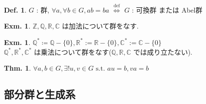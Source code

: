 \documentclass[uplatex,dvipdfmx,9pt]{beamer}
\newcommand{\defarrow}{\overset{\mathrm{def}}{\Leftrightarrow}}
\newcommand{\st}{\text{ s.t. }}
\newcounter{textThmCount}
\newcounter{textExmCount}
\theoremstyle{definition} %
\newtheorem{defn}{Def.}[subsection] %
\newtheorem{thmText}[textThmCount]{Thm.}
\theoremstyle{example}
\newtheorem{exmText}[textExmCount]{Exm.}
\begin{document}
      \begin{frame}

        \begin{defn}
          $G$ : 群, $\forall a, \forall b \in G, ab = ba$ $\defarrow$ $G$ : \alert{可換群} または \alert{Abel群}
        \end{defn}

        \begin{exmText}
          $\mathbb{Z}, \mathbb{Q}, \mathbb{R}, \mathbb{C}$ は加法について群をなす.
        \end{exmText}

        \begin{exmText}
          $\mathbb{Q}^* \coloneqq \mathbb{Q} - \{0\}, \mathbb{R}^* := \mathbb{R} - \{0\}, \mathbb{C}^* := \mathbb{C} - \{0\}$ \\
          $\mathbb{Q}^*, \mathbb{R}^*, \mathbb{C}^*$ は乗法について群をなす($\mathbb{Q}, \mathbb{R}, \mathbb{C}$ では成り立たない).
        \end{exmText}

        \begin{thmText}
          $\forall a,b \in G, \exists! u,v \in G \st au = b, va = b$
        \end{thmText}

      \end{frame}

    \subsection{\textsection \thesubsection 部分群と生成系}
    \setcounter{textExmCount}{0}
\end{document}
